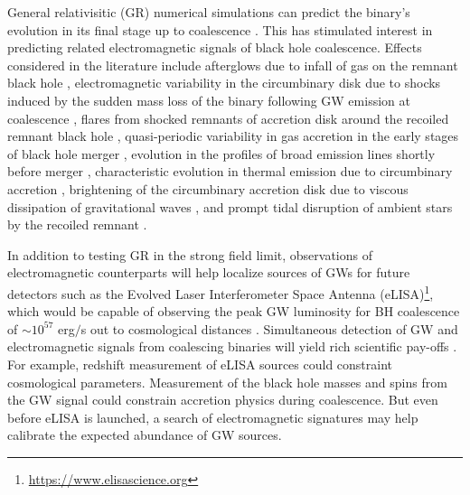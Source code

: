\documentclass[a4paper,fleqn,usenatbib]{mnras}
\begin{document}
General relativisitic (GR) numerical simulations can predict the
binary's evolution in its final stage up to coalescence
\citep{2005PhRvL..95l1101P, 2006PhRvL..96k1102B, 2006PhRvL..96k1101C}.
This has stimulated interest in predicting related electromagnetic
signals of black hole coalescence.  Effects considered in the
literature include afterglows due to infall of gas on the remnant
black hole \citep{2005ApJ...622L..93M}, electromagnetic variability in
the circumbinary disk due to shocks induced by the sudden mass loss of
the binary following GW emission at coalescence
\citep{2007APS..APR.S1010B, 2008ApJ...676L...5L}, flares from shocked
remnants of accretion disk around the recoiled remnant black hole
\citep{2007PhRvL..99d1103L, 2008ApJ...682..758S, 2009CQGra..26i4032H},
quasi-periodic variability in gas accretion in the early stages of
black hole merger \citep{2008ApJ...672...83M, 2009CQGra..26i4032H,
  2012MNRAS.427.2680K, 2013MNRAS.436.2997D, 2014ApJ...783..134F,
  2015ApJ...807..131S}, evolution in the profiles of broad emission
lines shortly before merger \citep{2013MNRAS.432.1468M},
characteristic evolution in thermal emission due to circumbinary
accretion \citep{2015MNRAS.446L..36F}, brightening of the circumbinary
accretion disk due to viscous dissipation of gravitational waves
\citep{2008PhRvL.101d1101K}, and prompt tidal disruption of ambient
stars by the recoiled remnant \citep{2011MNRAS.412...75S}.

In addition to testing GR in the strong field limit, observations of
electromagnetic counterparts will help localize sources of GWs for
future detectors such as the Evolved Laser Interferometer Space
Antenna (eLISA)\footnote{\url{https://www.elisascience.org}}, which
would be capable of observing the peak GW luminosity for BH
coalescence of $\sim 10^{57}$ erg$/$s out to cosmological distances
\citep{2003CQGra..20S..65H, 2013CQGra..30x4009S}.  Simultaneous
detection of GW and electromagnetic signals from coalescing binaries
will yield rich scientific pay-offs \citep{2003CQGra..20S..65H,
  2005ApJ...629...15H}.  For example, redshift measurement of eLISA
sources could constraint cosmological parameters.  Measurement of the
black hole masses and spins from the GW signal could constrain
accretion physics during coalescence.  But even before eLISA is
launched, a search of electromagnetic signatures may help calibrate
the expected abundance of GW sources.
\end{document}
